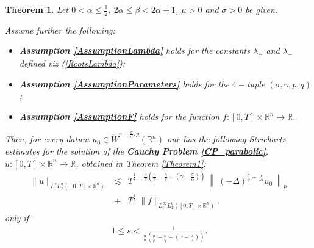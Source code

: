 \documentclass{amsart}
\newtheorem{theorem}{Theorem}[section]
\theoremstyle{definition}
\theoremstyle{remark}
\numberwithin{equation}{section}
\newcommand{\BR}{{\mathbb R}}
\begin{document}
		\begin{theorem}\label{Theorem1Strichartz}
			Let $0<\alpha\leq \frac{1}{2}$, $2\alpha\leq \beta< 2\alpha+1$, $\mu>0$ and $\sigma>0$ be given.
			
			Assume further the following:
			\begin{itemize}
				\item {\bf Assumption \ref{AssumptionLambda}} holds for the constants $\lambda_+$ and $\lambda_-$ defined viz (\ref{RootsLambda});
				\item {\bf Assumption \ref{AssumptionParameters}} holds for the $4-$tuple $(\sigma,\gamma,p,q)$;
				\item {\bf Assumption \ref{AssumptionF}} holds for the function $f:[0,T]\times \BR^n\longrightarrow \BR$.
			\end{itemize}
			
			Then, for every datum
			$u_0\in \dot{W}^{\gamma-\frac{\sigma}{\alpha},p}(\BR^n)$ one has the following Strichartz estimates for the solution of the {\bf Cauchy Problem \ref{CP_parabolic}}, $u:[0,T]\times \BR^n\longrightarrow \BR$, obtained in Theorem \ref{Theorem1}:
			\begin{eqnarray*}
				\label{BoundATheorem1Strichartz}
				\|u\|_{L^s_tL^q_x([0,T]\times\BR^n)}&\lesssim& T^{\frac{1}{s}-\frac{\alpha}{\sigma}\left(\frac{n}{p}-\frac{n}{q}-\left(\gamma-\frac{\sigma}{\alpha}\right)\right)}~\left\|~(-\Delta)^{\frac{\gamma}{2}-\frac{\sigma}{2\alpha}} u_0~\right\|_{p} \\
				\nonumber &+&T^{\frac{1}{s}}~\|f\|_{L^\infty_tL^q_x([0,T]\times\BR^n)},
			\end{eqnarray*}
			only if 
			\begin{eqnarray}
				\label{MixedNormConstraintA} ~1\leq s<\frac{1}{\frac{\alpha}{\sigma}\left(\frac{n}{p}-\frac{n}{q}-\left(\gamma-\frac{\sigma}{\alpha}\right)\right)}.
			\end{eqnarray}
		\end{theorem}
		
\end{document}
